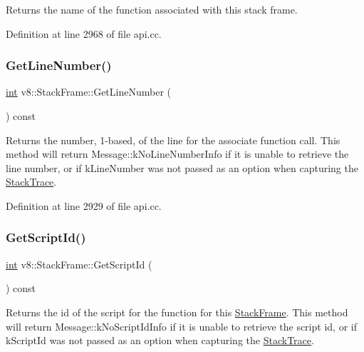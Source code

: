 Returns the name of the function associated with this stack frame. 

Definition at line 2968 of file api.\+cc.

\mbox{\label{classv8_1_1StackFrame_a34ab9f48a06525cd9f93e01a70427ca2}} 
\subsubsection{\texorpdfstring{Get\+Line\+Number()}{GetLineNumber()}}
{\footnotesize\ttfamily \mbox{\hyperlink{classint}{int}} v8\+::\+Stack\+Frame\+::\+Get\+Line\+Number (\begin{DoxyParamCaption}{ }\end{DoxyParamCaption}) const}

Returns the number, 1-\/based, of the line for the associate function call. This method will return Message\+::k\+No\+Line\+Number\+Info if it is unable to retrieve the line number, or if k\+Line\+Number was not passed as an option when capturing the \mbox{\hyperlink{classv8_1_1StackTrace}{Stack\+Trace}}. 

Definition at line 2929 of file api.\+cc.

\mbox{\label{classv8_1_1StackFrame_ac2f0f26b9c7aee860cdd613c0d83ae35}} 
\subsubsection{\texorpdfstring{Get\+Script\+Id()}{GetScriptId()}}
{\footnotesize\ttfamily \mbox{\hyperlink{classint}{int}} v8\+::\+Stack\+Frame\+::\+Get\+Script\+Id (\begin{DoxyParamCaption}{ }\end{DoxyParamCaption}) const}

Returns the id of the script for the function for this \mbox{\hyperlink{classv8_1_1StackFrame}{Stack\+Frame}}. This method will return Message\+::k\+No\+Script\+Id\+Info if it is unable to retrieve the script id, or if k\+Script\+Id was not passed as an option when capturing the \mbox{\hyperlink{classv8_1_1StackTrace}{Stack\+Trace}}. 

